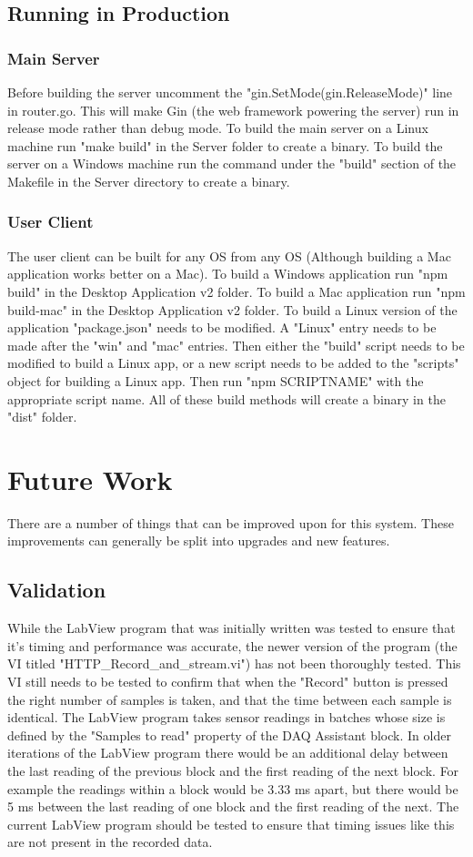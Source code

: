 \documentclass[10pt,technote]{IEEEtran}
\begin{document}
\subsection{Running in Production}
\subsubsection{Main Server}
Before building the server uncomment the "gin.SetMode(gin.ReleaseMode)" line in router.go. This will make Gin (the web framework powering the server) run in release mode rather than debug mode. To build the main server on a Linux machine run "make build" in the Server folder to create a binary. To build the server on a Windows machine run the command under the "build" section of the Makefile in the Server directory to create a binary.
\subsubsection{User Client}
The user client can be built for any OS from any OS (Although building a Mac application works better on a Mac). To build a Windows application run "npm build" in the Desktop Application v2 folder. To build a Mac application run "npm build-mac" in the Desktop Application v2 folder. To build a Linux version of the application "package.json" needs to be modified. A "Linux" entry needs to be made after the "win" and "mac" entries. Then either the "build" script needs to be modified to build a Linux app, or a new script needs to be added to the "scripts" object for building a Linux app. Then run "npm SCRIPTNAME" with the appropriate script name. All of these build methods will create a binary in the "dist" folder.

\section{Future Work}
There are a number of things that can be improved upon for this system. These improvements can generally be split into upgrades and new features.
\subsection{Validation}
While the LabView program that was initially written was tested to ensure that it's timing and performance was accurate, the newer version of the program (the VI titled "HTTP\_Record\_and\_stream.vi") has not been thoroughly tested. This VI still needs to be tested to confirm that when the "Record" button is pressed the right number of samples is taken, and that the time between each sample is identical. The LabView program takes sensor readings in batches whose size is defined by the "Samples to read" property of the DAQ Assistant block. In older iterations of the LabView program there would be an additional delay between the last reading of the previous block and the first reading of the next block. For example the readings within a block would be 3.33 ms apart, but there would be 5 ms between the last reading of one block and the first reading of the next. The current LabView program should be tested to ensure that timing issues like this are not present in the recorded data.
\end{document}
